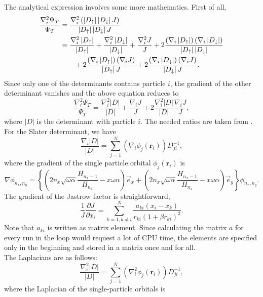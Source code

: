 The analytical expression involves some more mathematics. First of all,
\begin{align*}
\frac{\nabla_i^ 2\Psi_T}{\Psi_T} &= \frac{\nabla_i^ 2 \left(\left|D_{\uparrow}\right| \left|D_{\downarrow}\right|  J\right)}{\left|D_{\uparrow}\right| \left|D_{\downarrow}\right|  J}\\
&= \frac{\nabla_i^ 2 \left|D_{\uparrow}\right|}{\left|D_{\uparrow}\right|} + \frac{\nabla_i^ 2 \left|D_{\downarrow}\right|}{\left|D_{\downarrow}\right|} + \frac{\nabla_i^2 J}{J} + 2 \frac{\left(\nabla_i \left|D_{\uparrow}\right|\right) \left(\nabla_i \left|D_{\downarrow}\right|\right)}{\left|D_{\uparrow}\right| \left|D_{\downarrow}\right|}\\
& \qquad + 2\frac{\left(\nabla_i \left|D_{\uparrow}\right|\right) \left(\nabla_i J\right)}{\left|D_{\uparrow}\right| J} + 2\frac{\left(\nabla_i \left|D_{\downarrow}\right|\right) \left(\nabla_i J\right)}{\left|D_{\downarrow}\right| J}.
\end{align*}
Since only one of the determinants contains particle $i$, the gradient of the other determinant vanishes and the above equation reduces to
\[
\frac{\nabla_i^ 2\Psi_T}{\Psi_T} = \frac{\nabla_i^ 2 |D|}{|D|} + \frac{\nabla_i J}{J} + 2 \frac{\nabla_i^ 2 |D|}{|D|} \frac{\nabla_i J}{J},
\]
where $|D|$ is the determinant with particle $i$.
The needed ratios are taken from \cite{SkriptMorten}. For the Slater determinant, we have
\begin{equation}
\frac{\nabla_i |D|}{|D|} = \sum_{j=1}^N \left(\nabla_i \phi_j\left(\mathbf{r}_i\right)\right)D_{ji}^{-1},
\end{equation}
where the gradient of the single particle orbital $\phi_j\left(\mathbf{r}_i\right)$ is 
\begin{equation*}
\nabla \phi_{n_x,n_y} =  \left\lbrace\left(2n_x\sqrt{\omega\alpha}\frac{H_{n_x-1}}{H_{n_x}} - x\omega\alpha \right)\vec{e}_x 
+ \left(2n_x\sqrt{\omega\alpha}\frac{H_{n_x-1}}{H_{n_x}} - x\omega\alpha \right)\vec{e}_y\right\rbrace \phi_{n_x,n_y}.
\end{equation*}
The gradient of the Jastrow factor is straightforward,
\begin{equation}
\frac{1}{J}\frac{\partial J}{\partial x_i} = \sum\limits_{k=1,k\neq i}^{N}\frac{a_{ki}(x_i-x_k)}{r_{ki}(1+\beta r_{ki})^ 2}.
\end{equation}
Note that $a_{ki}$ is written as matrix element. Since calculating the matrix $a$ for every run in the loop would request a lot of CPU time, the elements are specified only in the beginning and stored in a matrix once and for all.\\
The Laplacians are as follows:
\begin{equation}
\frac{\nabla_i^2|D|}{|D|} = \sum_{j=1}^{N} \left(\nabla_i^2 \phi_j\left(\mathbf{r}_i\right)\right)D_{ji}^{-1},
\end{equation}
where the Laplacian of the single-particle orbitals is

